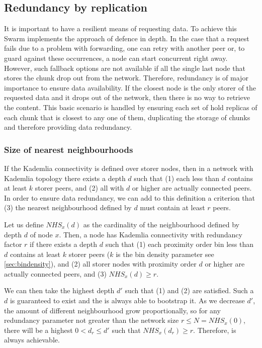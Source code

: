 \subsection{Redundancy by replication\statusgreen}\label{sec:redundancy-by-local-replication}

It is important to have a resilient means of requesting data. To achieve this Swarm implements the approach of defence in depth. In the case that a request fails due to a problem with forwarding, one can retry with another peer or, to guard against these occurrences, a node can start concurrent  right away. However, such fallback options are not available if all the single last node that stores the chunk drop out from the network. Therefore, redundancy is of major importance to ensure data availability. If the closest node is the only storer of the requested data and it drops out of the network, then there is no way to retrieve the content. This basic scenario is handled by ensuring each set of  hold replicas of each chunk that is closest to any one of them, duplicating the storage of chunks and therefore providing data redundancy. 

\subsubsection{Size of nearest neighbourhoods}

If the Kademlia connectivity is defined over storer nodes, then in a network with Kademlia topology there exists a depth $d$ such that (1) each  less than $d$ contains at least $k$ storer peers, and (2) all  with  $d$ or higher are actually connected peers. In order to ensure data redundancy, we can add to this definition a criterion that (3) the nearest neighbourhood defined by $d$ must contain at least $r$ peers.

Let us define  $\mathit{NHS}_x(d)$  as the cardinality of the neighbourhood defined by depth $d$ of node $x$. 
Then, a node has Kademlia connectivity with redundancy factor $r$ if there exists a depth $d$ such that (1) each proximity order bin less than $d$ contains at least $k$ storer peers ($k$ is the bin density parameter see \ref{sec:bindensity}), and (2) all storer nodes with proximity order $d$ or higher are actually connected peers, and (3) $\mathit{NHS}_x(d)\geq r$.

We can then take the highest depth $d'$ such that (1) and (2) are satisfied. Such a $d$ is guaranteed to exist and the  is always able to bootstrap it. As we decrease $d'$, the amount of different neighbourhood grow proportionally, so for any redundancy parameter not greater than the network size $r\leq N=\mathit{NHS}_x(0)$, there will be a highest $0<d_r\leq d'$ such that $\mathit{NHS}_x(d_r)\geq r$. Therefore,  is always achievable. 



